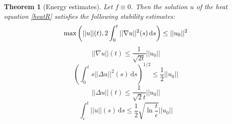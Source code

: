\documentclass[12pt, a4paper]{article}
\newcommand{\rd}{\ensuremath{\mathrm{d}}}
\newcommand{\id}{\ensuremath{\,\rd}}
\newtheorem{theorem}{Theorem}[section]
\numberwithin{equation}{section}
\begin{document}
\begin{theorem}[Energy estimates]
Let $f\equiv 0$. Then the solution $u$ of the heat equation \eqref{heatR} satisfies the following stability estimates:
\begin{equation}
\label{ett}
\textnormal{max}\left( ||u||(t), 2\int_0^t ||\nabla u||^2(s)\id s \right ) \leq ||u_0||^2
\end{equation}
\begin{equation}
\label{sex}
||\nabla u||(t) \leq \frac{1}{\sqrt{2t}}||u_0||
\end{equation}
\begin{equation}
\label{sju}
\left( \int_0^t s||\Delta u||^2(s)\id s\right)^{1/2} \leq \frac{1}{2}||u_0||
\end{equation}
\begin{equation}
\label{åtta}
||\Delta u||(t) \leq \frac{1}{\sqrt{2}t}||u_0||
\end{equation}
\begin{equation}
\int_\epsilon^t ||\dot{u}||(s)\id s \leq \frac{1}{2}\sqrt{\ln{\frac{t}{\epsilon}}} ||u_0||
\end{equation}
\end{theorem}
\end{document}

